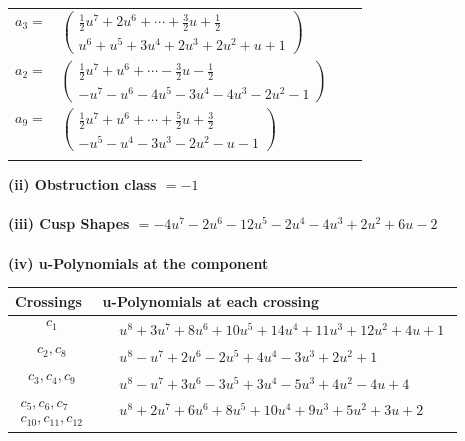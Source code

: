 \documentclass[1p]{elsarticle_modified}
\theoremstyle{definition}
\begin{document}
\begin{tabular}{m{7pt} m{180pt} m{7pt} m{180pt} }
\flushright $a_{3}=$&$\begin{pmatrix}\frac{1}{2} u^7+2 u^6+\cdots+\frac{3}{2} u+\frac{1}{2}\\u^6+u^5+3 u^4+2 u^3+2 u^2+u+1\end{pmatrix}$ \\
\flushright $a_{2}=$&$\begin{pmatrix}\frac{1}{2} u^7+u^6+\cdots-\frac{3}{2} u-\frac{1}{2}\\- u^7- u^6-4 u^5-3 u^4-4 u^3-2 u^2-1\end{pmatrix}$ \\
\flushright $a_{9}=$&$\begin{pmatrix}\frac{1}{2} u^7+u^6+\cdots+\frac{5}{2} u+\frac{3}{2}\\- u^5- u^4-3 u^3-2 u^2- u-1\end{pmatrix}$\\&\end{tabular}
\flushleft \textbf{(ii) Obstruction class $= -1$}\\~\\
\flushleft \textbf{(iii) Cusp Shapes $= -4 u^7-2 u^6-12 u^5-2 u^4-4 u^3+2 u^2+6 u-2$}\\~\\
\newpage\renewcommand{\arraystretch}{1}
\flushleft \textbf{(iv) u-Polynomials at the component}\newline \\
\begin{tabular}{m{50pt}|m{274pt}}
Crossings & \hspace{64pt}u-Polynomials at each crossing \\
\hline $$\begin{aligned}c_{1}\end{aligned}$$&$\begin{aligned}
&u^8+3 u^7+8 u^6+10 u^5+14 u^4+11 u^3+12 u^2+4 u+1
\end{aligned}$\\
\hline $$\begin{aligned}c_{2},c_{8}\end{aligned}$$&$\begin{aligned}
&u^8- u^7+2 u^6-2 u^5+4 u^4-3 u^3+2 u^2+1
\end{aligned}$\\
\hline $$\begin{aligned}c_{3},c_{4},c_{9}\end{aligned}$$&$\begin{aligned}
&u^8- u^7+3 u^6-3 u^5+3 u^4-5 u^3+4 u^2-4 u+4
\end{aligned}$\\
\hline $$\begin{aligned}c_{5},c_{6},c_{7}\\c_{10},c_{11},c_{12}\end{aligned}$$&$\begin{aligned}
&u^8+2 u^7+6 u^6+8 u^5+10 u^4+9 u^3+5 u^2+3 u+2
\end{aligned}$\\
\hline
\end{tabular}\\~\\
\end{document}
